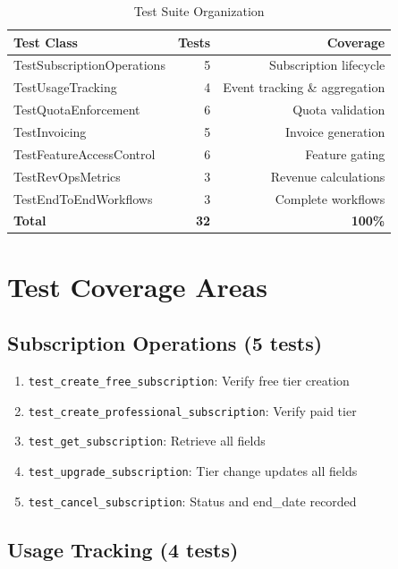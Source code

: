 \documentclass[12pt]{report}
\begin{document}
\begin{table}[h]
\centering
\begin{tabular}{lrr}
\toprule
\textbf{Test Class} & \textbf{Tests} & \textbf{Coverage} \\
\midrule
TestSubscriptionOperations & 5 & Subscription lifecycle \\
TestUsageTracking & 4 & Event tracking \& aggregation \\
TestQuotaEnforcement & 6 & Quota validation \\
TestInvoicing & 5 & Invoice generation \\
TestFeatureAccessControl & 6 & Feature gating \\
TestRevOpsMetrics & 3 & Revenue calculations \\
TestEndToEndWorkflows & 3 & Complete workflows \\
\midrule
\textbf{Total} & \textbf{32} & \textbf{100\%} \\
\bottomrule
\end{tabular}
\caption{Test Suite Organization}
\end{table}

\section{Test Coverage Areas}

\subsection{Subscription Operations (5 tests)}

\begin{enumerate}
    \item \lstinline{test_create_free_subscription}: Verify free tier creation
    \item \lstinline{test_create_professional_subscription}: Verify paid tier
    \item \lstinline{test_get_subscription}: Retrieve all fields
    \item \lstinline{test_upgrade_subscription}: Tier change updates all fields
    \item \lstinline{test_cancel_subscription}: Status and end\_date recorded
\end{enumerate}

\subsection{Usage Tracking (4 tests)}
\end{document}
